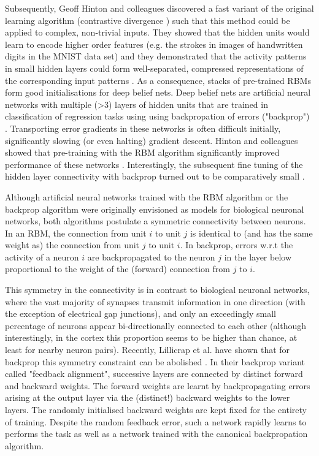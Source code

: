 \documentclass[11pt]{article}
\begin{document}
Subsequently, Geoff Hinton and colleagues discovered a fast variant of
the original learning algorithm (contrastive divergence
\cite{Hinton2002,Carreira-Perpinan2005}) such that this method could be
applied to complex, non-trivial inputs. They showed that the hidden
units would learn to encode higher order features (e.g. the strokes in
images of handwritten digits in the MNIST data set) and they
demonstrated that the activity patterns in small hidden layers could
form well-separated, compressed representations of the corresponding
input patterns \cite{Hinton2006b}. As a consequence, stacks of
pre-trained RBMs form good initialisations for deep belief nets. Deep
belief nets are artificial neural networks with multiple
(\textgreater 3) layers of hidden units that are trained in
classification of regression tasks using using backpropation of errors
("backprop") \cite{Rumelhart1986}. Transporting error gradients in these
networks is often difficult initially, significantly slowing (or even
halting) gradient descent. Hinton and colleagues showed that
pre-training with the RBM algorithm significantly improved performance
of these networks \cite{Hinton2006a,Hinton2006b}. Interestingly, the
subsequent fine tuning of the hidden layer connectivity with backprop
turned out to be comparatively small \cite{Erhan2010}.

Although artificial neural networks trained with the RBM algorithm or
the backprop algorithm were originally envisioned as models for
biological neuronal networks, both algorithms postulate a symmetric
connectivity between neurons. In an RBM, the connection from unit $i$
to unit $j$ is identical to (and has the same weight as) the
connection from unit $j$ to unit $i$. In backprop, errors w.r.t the
activity of a neuron $i$ are backpropagated to the neuron $j$ in the
layer below proportional to the weight of the (forward) connection
from $j$ to $i$.


This symmetry in the connectivity is in contrast to biological
neuronal networks, where the vast majority of synapses transmit
information in one direction (with the exception of electrical gap
junctions), and only an exceedingly small percentage of neurons appear
bi-directionally connected to each other (although interestingly, in
the cortex this proportion seems to be higher than chance, at least
for nearby neuron pairs).
Recently, Lillicrap et al. have shown that for backprop this symmetry
constraint can be abolished \cite{Lillicrap2014}. In their backprop
variant called "feedback alignment", successive layers are connected
by distinct forward and backward weights. The forward weights are
learnt by backpropagating errors arising at the output layer via the
(distinct!) backward weights to the lower layers. The randomly
initialised backward weights are kept fixed for the entirety of
training. Despite the random feedback error, such a network rapidly
learns to performs the task as well as a network trained with the
canonical backpropation algorithm.
\end{document}
